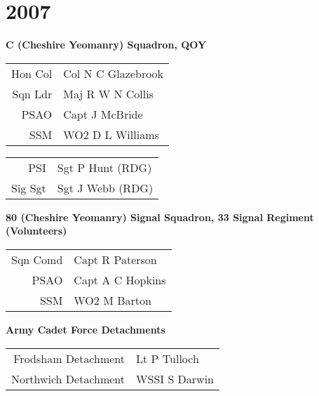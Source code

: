 \chapter*{2007}

\begin{center}
  \Large
  \textbf{C (Cheshire Yeomanry) Squadron, QOY}
\end{center}

\begin{center}
  \begin{tabular}{rl}
    Hon Col & Col N C Glazebrook \\
    Sqn Ldr & Maj R W N Collis \\
    PSAO & Capt J McBride \\
    SSM & WO2 D L Williams \\
  \end{tabular}
\end{center}

\begin{center}
  \begin{tabular}{rl}
    PSI & Sgt P Hunt (RDG) \\
    Sig Sgt & Sgt J Webb (RDG) \\
  \end{tabular}
\end{center}

\begin{center}
  \Large
  \textbf{80 (Cheshire Yeomanry) Signal Squadron, 33 Signal Regiment (Volunteers)}
\end{center}

\begin{center}
  \begin{tabular}{rl}
    Sqn Comd & Capt R Paterson \\
    PSAO & Capt A C Hopkins \\
    SSM & WO2 M Barton \\
  \end{tabular}
\end{center}

\begin{center}
  \Large
  \textbf{Army Cadet Force Detachments}
\end{center}

\begin{center}
  \begin{tabular}{rl}
    Frodsham Detachment & Lt P Tulloch \\
    Northwich Detachment & WSSI S Darwin \\
  \end{tabular}
\end{center}
